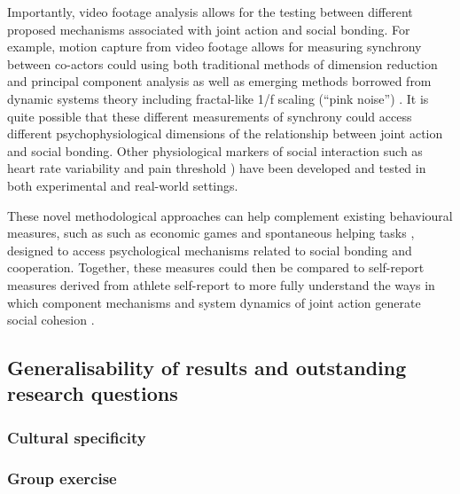 Importantly, video footage analysis allows for the testing between different proposed mechanisms associated with joint action and social bonding.  For example, motion capture from video footage allows for measuring synchrony between co-actors could using both traditional methods of dimension reduction and principal component analysis \citep[see for example][]{Riley2011} as well as emerging methods borrowed from dynamic systems theory including fractal-like 1/f scaling (``pink noise'') \citep[see for example][; see Appendix ~\ref{app2:dynamicCoupling} for an explanation]{Holden2013}.  It is quite possible that these different measurements of synchrony could access different psychophysiological dimensions of the relationship between joint action and social bonding.  Other physiological markers of social interaction such as heart rate variability \citep{Konvalinka2011,Fischer2014a} and pain threshold \citep{Cohen2009,Tarr2015}) have been developed and tested in both experimental and real-world settings.

These novel methodological approaches can help complement existing behavioural measures, such as such as economic games \citep{Xygalatas2013} and spontaneous helping tasks \citep{Kirschner2010}, designed to access psychological mechanisms related to social bonding and cooperation. Together, these measures could then be compared to self-report measures derived from athlete self-report to more fully understand the ways in which component mechanisms and system dynamics of joint action generate social cohesion \citep{Marsh2009}.







\subsection{Generalisability of results and outstanding research questions}

   \subsubsection{Cultural specificity}


   \subsubsection{Group exercise}

